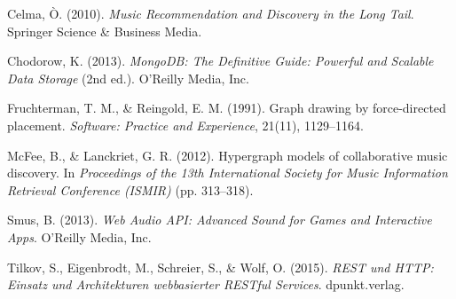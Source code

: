\documentclass[12pt,a4paper,oneside]{report}
\begin{document}
\begin{enumerate}[label={[\arabic*]}]
    \item Celma, \`O. (2010). \textit{Music Recommendation and Discovery in the Long Tail}. Springer Science \& Business Media.
    \item Chodorow, K. (2013). \textit{MongoDB: The Definitive Guide: Powerful and Scalable Data Storage} (2nd ed.). O'Reilly Media, Inc.
    \item Fruchterman, T. M., \& Reingold, E. M. (1991). Graph drawing by force-directed placement. \textit{Software: Practice and Experience}, 21(11), 1129--1164.
    \item McFee, B., \& Lanckriet, G. R. (2012). Hypergraph models of collaborative music discovery. In \textit{Proceedings of the 13th International Society for Music Information Retrieval Conference (ISMIR)} (pp. 313--318).
    \item Smus, B. (2013). \textit{Web Audio API: Advanced Sound for Games and Interactive Apps}. O'Reilly Media, Inc.
    \item Tilkov, S., Eigenbrodt, M., Schreier, S., \& Wolf, O. (2015). \textit{REST und HTTP: Einsatz und Architekturen webbasierter RESTful Services}. dpunkt.verlag.
\end{enumerate}
\end{document}
